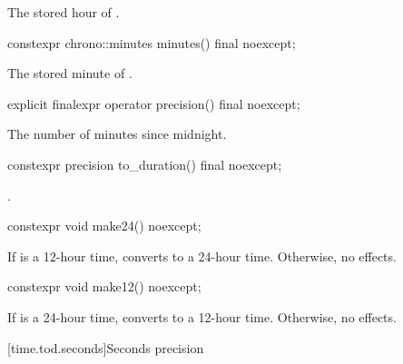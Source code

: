 \begin{itemdescr}
\pnum
\returns The stored hour of .
\end{itemdescr}

%
\begin{itemdecl}
constexpr chrono::minutes minutes() final noexcept;
\end{itemdecl}

\begin{itemdescr}
\pnum
\returns The stored minute of .
\end{itemdescr}

%
\begin{itemdecl}
explicit finalexpr operator precision() final noexcept;
\end{itemdecl}

\begin{itemdescr}
\pnum
\returns The number of minutes since midnight.
\end{itemdescr}

%
\begin{itemdecl}
constexpr precision to_duration() final noexcept;
\end{itemdecl}

\begin{itemdescr}
\pnum
\returns {}.
\end{itemdescr}

%
\begin{itemdecl}
constexpr void make24() noexcept;
\end{itemdecl}

\begin{itemdescr}
\pnum
\effects
If  is a 12-hour time,
converts to a 24-hour time.
Otherwise, no effects.
\end{itemdescr}

%
\begin{itemdecl}
constexpr void make12() noexcept;
\end{itemdecl}

\begin{itemdescr}
\pnum
\effects
If  is a 24-hour time,
converts to a 12-hour time.
Otherwise, no effects.
\end{itemdescr}

[time.tod.seconds]{Seconds precision}

